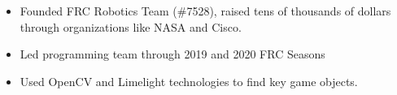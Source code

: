\documentclass[10pt,a4paper,ragged2e,withhyper]{altacv}
\begin{document}
\begin{paracol}{2}
            \begin{itemize}
                \item Founded FRC Robotics Team (\#7528), raised tens of thousands of dollars through organizations like NASA and Cisco.
                \item Led programming team through 2019 and 2020 FRC Seasons
                \item Used OpenCV and Limelight technologies to find key game objects.
            \end{itemize}
            \divider
            
            
    \end{paracol}
\end{document}
